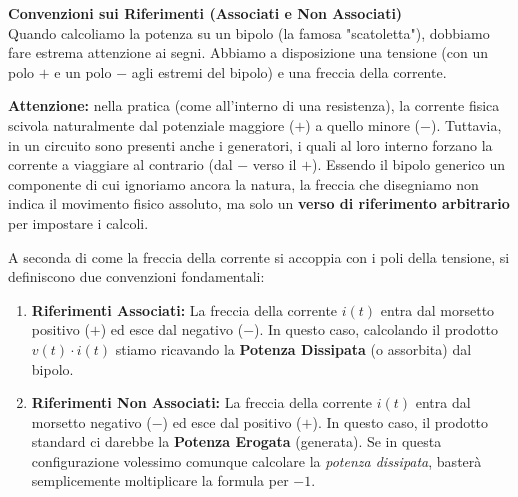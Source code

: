 \documentclass[12pt, a4paper]{article}
\begin{document}
\begin{itemize}[label=\textcolor{titlecolor}{\Large\textbullet}, itemsep=12pt, parsep=4pt, leftmargin=1.5cm]
		\vspace{0.2cm}
		\textbf{Convenzioni sui Riferimenti (Associati e Non Associati)}\\
		Quando calcoliamo la potenza su un bipolo (la famosa "scatoletta"), dobbiamo fare estrema attenzione ai segni. Abbiamo a disposizione una tensione (con un polo $+$ e un polo $-$ agli estremi del bipolo) e una freccia della corrente. 
		
		\textbf{Attenzione:} nella pratica (come all'interno di una resistenza), la corrente fisica scivola naturalmente dal potenziale maggiore ($+$) a quello minore ($-$). Tuttavia, in un circuito sono presenti anche i generatori, i quali al loro interno forzano la corrente a viaggiare al contrario (dal $-$ verso il $+$). Essendo il bipolo generico un componente di cui ignoriamo ancora la natura, la freccia che disegniamo non indica il movimento fisico assoluto, ma solo un \textbf{verso di riferimento arbitrario} per impostare i calcoli. 
		
		A seconda di come la freccia della corrente si accoppia con i poli della tensione, si definiscono due convenzioni fondamentali:
		
		\begin{enumerate}
			\item \textbf{Riferimenti Associati:} La freccia della corrente $i(t)$ entra dal morsetto positivo ($+$) ed esce dal negativo ($-$). In questo caso, calcolando il prodotto $v(t) \cdot i(t)$ stiamo ricavando la \textbf{Potenza Dissipata} (o assorbita) dal bipolo.
			
			\item \textbf{Riferimenti Non Associati:} La freccia della corrente $i(t)$ entra dal morsetto negativo ($-$) ed esce dal positivo ($+$). In questo caso, il prodotto standard ci darebbe la \textbf{Potenza Erogata} (generata). Se in questa configurazione volessimo comunque calcolare la \textit{potenza dissipata}, basterà semplicemente moltiplicare la formula per $-1$.
		\end{enumerate}
		

\end{itemize}
\end{document}
